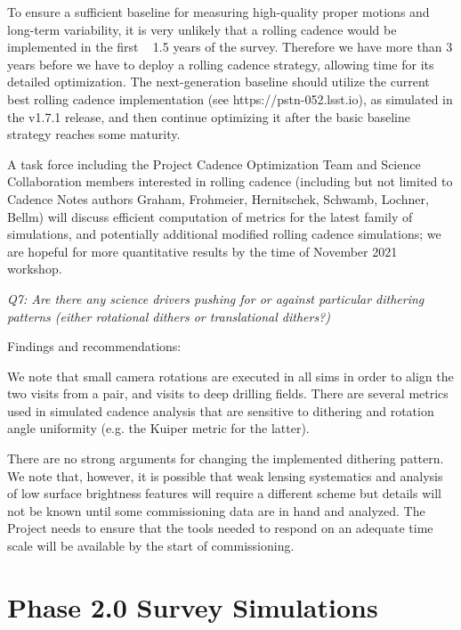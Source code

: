 To ensure a sufficient baseline for measuring high-quality proper motions and long-term variability, it is very unlikely that a rolling cadence would be implemented in the first ~ 1.5 years of the survey. Therefore we have more than 3 years before we have to deploy a rolling cadence strategy, allowing time for its detailed optimization. The next-generation baseline should utilize the current best rolling cadence implementation (see https://pstn-052.lsst.io), as simulated in the v1.7.1 release, and then continue optimizing it after the basic baseline strategy reaches some maturity. 

A task force including the Project Cadence Optimization Team and Science Collaboration members interested in rolling cadence (including but not limited to Cadence Notes authors Graham, Frohmeier, Hernitschek, Schwamb, Lochner, Bellm) will discuss efficient computation of metrics for the latest family of simulations, and potentially additional modified rolling cadence simulations; we are hopeful for more quantitative results by the time of November 2021 workshop.


{\it Q7:  Are there any science drivers pushing for or against particular dithering patterns (either rotational dithers or translational dithers?)  }

Findings and recommendations:

We note that small camera rotations are executed in all sims in order to align the two visits from a pair, and visits to deep drilling fields. There are several metrics used in simulated cadence analysis that are sensitive to dithering and rotation angle uniformity (e.g. the Kuiper metric for the latter). 

There are no strong arguments for changing the implemented dithering pattern. We note that, however, it is possible that weak lensing systematics and analysis of low surface brightness features will require a different scheme but details will not be known until some commissioning data are in hand and analyzed. The Project needs to ensure that the tools needed to respond on an adequate time scale will be available by the start of commissioning. 
 


\section{Phase 2.0 Survey Simulations}

